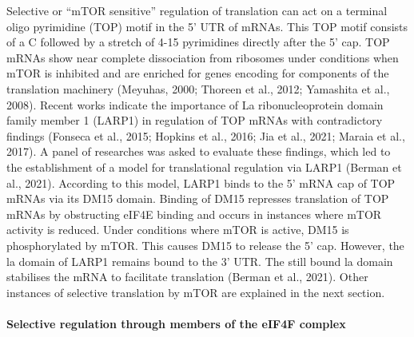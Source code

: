 \documentclass[
  12pt,
  openany]{book}
\begin{document}
Selective or ``mTOR sensitive'' regulation of translation can act on a terminal oligo pyrimidine (TOP) motif in the 5' UTR of mRNAs. This TOP motif consists of a C followed by a stretch of 4-15 pyrimidines directly after the 5' cap. TOP mRNAs show near complete dissociation from ribosomes under conditions when mTOR is inhibited and are enriched for genes encoding for components of the translation machinery (Meyuhas, 2000; Thoreen et al., 2012; Yamashita et al., 2008). Recent works indicate the importance of La ribonucleoprotein domain family member 1 (LARP1) in regulation of TOP mRNAs with contradictory findings (Fonseca et al., 2015; Hopkins et al., 2016; Jia et al., 2021; Maraia et al., 2017). A panel of researches was asked to evaluate these findings, which led to the establishment of a model for translational regulation via LARP1 (Berman et al., 2021). According to this model, LARP1 binds to the 5' mRNA cap of TOP mRNAs via its DM15 domain. Binding of DM15 represses translation of TOP mRNAs by obstructing eIF4E binding and occurs in instances where mTOR activity is reduced. Under conditions where mTOR is active, DM15 is phosphorylated by mTOR. This causes DM15 to release the 5' cap. However, the la domain of LARP1 remains bound to the 3' UTR. The still bound la domain stabilises the mRNA to facilitate translation (Berman et al., 2021). Other instances of selective translation by mTOR are explained in the next section.

\paragraph{Selective regulation through members of the eIF4F complex} \label{sel4F}
\end{document}
